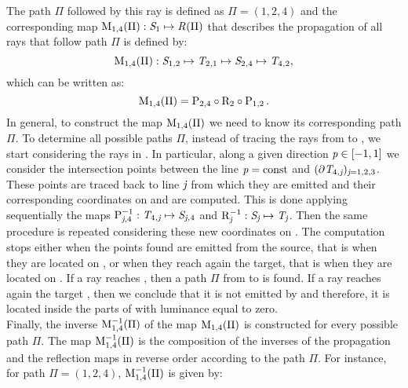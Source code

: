  The path $\Pi$ followed by this ray is defined as $\Pi =(1, 2, 4)$ and
the corresponding map $\mathrm{M}_{1,4}(\Pi):\mbox{$\emph{S}_{\textit{$1$}}$}\mapsto \mbox{$\emph{R}_{\textit{}}$}(\Pi)$ that describes the propagation of all rays that follow path $\Pi$ is defined by:
\begin{equation}
\label{map_example}
\mathrm{M}_{1,4}(\Pi):\mbox{$\emph{S}_{\textit{$1$,$2$}}$}\mapsto \mbox{$\emph{T}_{\textit{$2$,$1$}}$}\mapsto\mbox{$\emph{S}_{\textit{$2$,$4$}}$}\mapsto \mbox{$\emph{T}_{\textit{$4$,$2$}}$},
\end{equation} which can be written as:
\begin{equation}
\mathrm{M}_{1,4}(\Pi) = \mathrm{P}_{2,4}
\circ \mathrm{R}_{2}\circ \mathrm{P}_{1,2}\,.
\end{equation}
In general, to construct the map $\mathrm{M}_{1,4}(\Pi)$ we need to know its corresponding path $\Pi$.
To determine all possible paths $\Pi$,
instead of tracing the rays from  to , we start considering the rays in .
In particular, along a given direction $\textit{p}\in[-1,1]$ we consider the intersection points between the line $\textit{p}=\mbox{const}$ and $(\partial\mbox{$\emph{T}_{\textit{$4$,\textit{j}}}$})_{\textit{j}=1, 2, 3}$. These points are traced back to line $\textit{j}$ from which they are emitted and their corresponding coordinates on  and  are computed. This is done applying sequentially the maps $\mathrm{P}_{{\textit{j},4}}^{-1}:\mbox{$\emph{T}_{\textit{$4$,\textit{j}}}$}\mapsto\mbox{$\emph{S}_{\textit{\textit{j},$4$}}$}$ and $\mathrm{R}_{{\textit{j}}}^{-1}:\mbox{$\emph{S}_{\textit{\textit{j}}}$}\mapsto\mbox{$\emph{T}_{\textit{\textit{j}}}$}$.
Then the same procedure is repeated considering these new coordinates on .
The computation stops either when the points found are emitted from the source, that is when they are located on , or when they reach again the target, that is when they are located on .
If a ray reaches , then a path $\Pi$ from  to  is found.
If a ray reaches again the target , then we conclude that it is not emitted by
 and therefore, it is located inside the parts of  with luminance equal to zero. \\ \indent
 Finally, the inverse $\mathrm{M}_{{1,4}}^{-1}(\Pi)$ of the map $\mathrm{M}_{1,4}(\Pi)$ is constructed for every possible path $\Pi$.
 The map $\mathrm{M}_{{1,4}}^{-1}(\Pi)$ is the composition of the inverses of the propagation and the reflection maps in reverse order according to the path $\Pi$.
For instance, for path $\Pi = (1,2,4)$, $\mathrm{M}_{{1,4}}^{-1}(\Pi)$ is given by:
